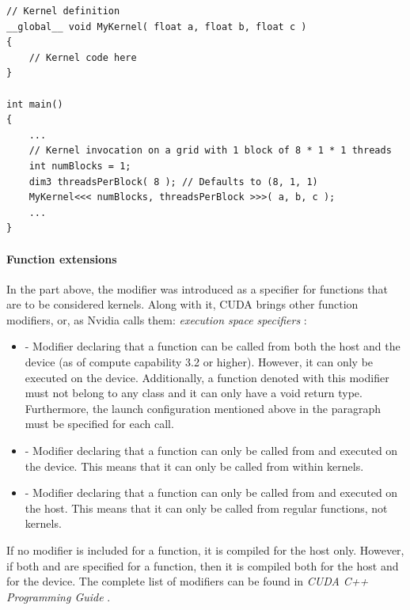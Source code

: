 \begin{lstlisting}[caption={Example of C++ pseudocode of a Kernel launch on a grid consisting of 1 one-dimensional block that is made up of 8 threads. Taken from Nvidia's \emph{CUDA C++ Programming Guide} \cite{NVIDIAMay2022}.},label={Listing:theory-CUDA-kernel-example}]
// Kernel definition
__global__ void MyKernel( float a, float b, float c )
{
	// Kernel code here
}

int main()
{
	...
	// Kernel invocation on a grid with 1 block of 8 * 1 * 1 threads
	int numBlocks = 1;
	dim3 threadsPerBlock( 8 ); // Defaults to (8, 1, 1)
	MyKernel<<< numBlocks, threadsPerBlock >>>( a, b, c );
	...
}
\end{lstlisting}

\paragraph{Function extensions}\label{Paragraph:theory-CUDA-C++-extensions-outer-kernel-extensions-function-extensions}
In the part above, the  modifier was introduced as a specifier for functions that are to be considered kernels. Along with it, CUDA brings other function modifiers, or, as Nvidia calls them: \textit{execution space specifiers} \cite{NVIDIAMay2022}:

\begin{itemize}
	\item {} - Modifier declaring that a function can be called from both the host and the device (as of compute capability 3.2 or higher). However, it can only be executed on the device. Additionally, a function denoted with this modifier must not belong to any class and it can only have a void return type. Furthermore, the launch configuration mentioned above in the \textit{} paragraph must be specified for each call.
	\item {} - Modifier declaring that a function can only be called from and executed on the device. This means that it can only be called from within kernels.
	\item {} - Modifier declaring that a function can only be called from and executed on the host. This means that it can only be called from regular functions, not kernels.
\end{itemize}

If no modifier is included for a function, it is compiled for the host only. However, if both  and  are specified for a function, then it is compiled both for the host and for the device. The complete list of modifiers can be found in \emph{CUDA C++ Programming Guide} \cite{NVIDIAMay2022}.


